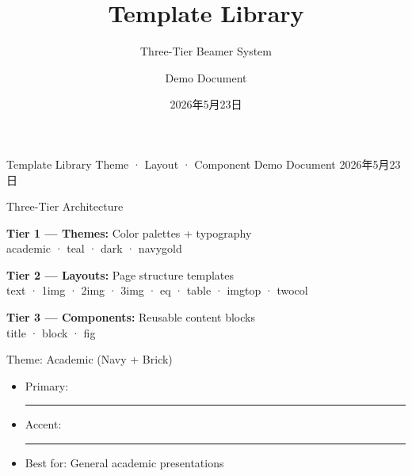 \documentclass[aspectratio=169,10pt]{beamer}
\title{Template Library}
\subtitle{Three-Tier Beamer System}
\author{Demo Document}
\institute{Theme + Layout + Component}
\date{2026年5月23日}
\begin{document}
\TLtitlecenter
  {Template Library}
  {Theme · Layout · Component}
  {Demo Document}
  {2026年5月23日}


\begin{frame}{Three-Tier Architecture}
  \begin{TLtext}
    \textbf{Tier 1 — Themes:} Color palettes + typography\\
    \quad academic · teal · dark · navygold
    
    \vspace{0.8em}
    \textbf{Tier 2 — Layouts:} Page structure templates\\
    \quad text · 1img · 2img · 3img · eq · table · imgtop · twocol
    
    \vspace{0.8em}
    \textbf{Tier 3 — Components:} Reusable content blocks\\
    \quad title · block · fig
  \end{TLtext}
  
\end{frame}


\begin{frame}{Theme: Academic (Navy + Brick)}
  \begin{TLtext}
    \begin{itemize}
      \item Primary:  \textcolor{TLprimary}{\rule{1cm}{0.5em}}
      \item Accent:  \textcolor{TLaccent}{\rule{1cm}{0.5em}}
      \item Best for: General academic presentations
    \end{itemize}
  \end{TLtext}
  
  
  \vspace{0.3em}
\end{frame}
\end{document}
